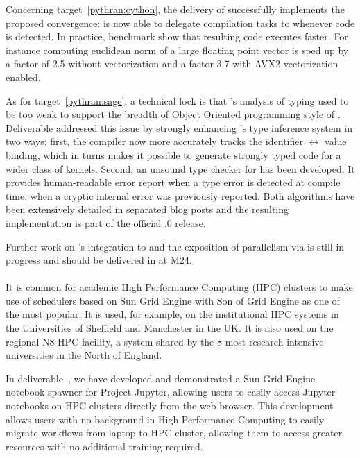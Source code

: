 \documentclass{deliverablereport}
\begin{document}
Concerning target~\ref{pythran:cython}, the delivery of  successfully implements the
proposed convergence: \Cython is now able to delegate compilation tasks to
\Pythran whenever \Numpy code is detected. In practice, benchmark show that
resulting code executes faster. For instance computing euclidean norm of a large
floating point vector is sped up by a factor of 2.5 without vectorization and
a factor 3.7 with AVX2 vectorization enabled.

As for target~\ref{pythran:sage}, a technical lock is that \Pythran's analysis
of \Python typing used to be too weak to support the breadth of Object Oriented
programming style of \Sage. Deliverable 
addressed this issue by strongly enhancing \Pythran's type inference system in two ways: first, the compiler now more accurately tracks the identifier
$\leftrightarrow$ value binding, which in turns makes it possible to generate strongly
typed code for a wider class of \Python kernels.  Second, an unsound type checker for
\Pythran has been developed. It provides human-readable error report when a type error is
detected at compile time, when a cryptic internal error was previously reported. Both
algorithms have been extensively detailed in separated blog posts and the resulting
implementation is part of the official .0 release.

Further work on \Pythran's integration to \Sage and the exposition of
parallelism via  is still in progress and should be delivered in
 at M24.

  \paragraph{}
  
It is common for academic High Performance Computing (HPC) clusters to make
use of schedulers based on Sun Grid Engine with Son of Grid Engine as one of
the most popular. It is used, for example, on the institutional HPC systems
in the Universities of Sheffield and Manchester in the UK. It is also used
on the regional N8 HPC facility, a system shared by the 8 most research
intensive universities in the North of England.

In deliverable~, we have developed and demonstrated a Sun Grid Engine
notebook spawner for Project Jupyter, allowing users to easily access
Jupyter notebooks on HPC clusters directly from the web-browser. This
development allows users with no background in High Performance Computing to
easily migrate workflows from laptop to HPC cluster, allowing them to access
greater resources with no additional training required.
  
\end{document}
